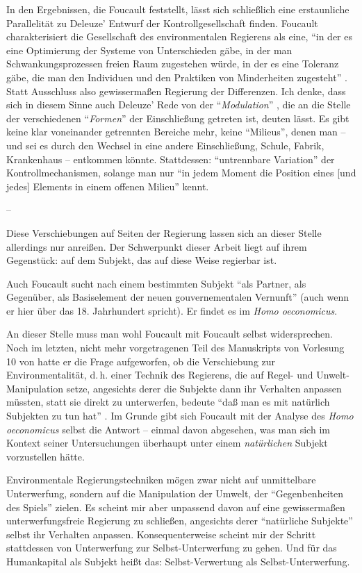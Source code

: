 \documentclass[12pt,
               DIV13,
               paper=a4,
               twoside=false,
               onehalfspacing,
               bibliography=totoc,
               toc=graduated,
               draft,
               ]{scrartcl}
\newcommand{\tit}[1]{\textit{#1}}
\newcommand{\pc}[2]{\parencite[#1]{#2}}
\newcommand{\vgl}[2]{\parencite[vgl.][#1]{#2}}
\newcommand{\worries}[1]{\ifdraft{\textcolor{blue}{\texttt{(#1)}}}{}}
\newcommand{\hoe}{\tit{Homo oeconomicus}\xspace}
\begin{document}
In den Ergebnissen, die Foucault feststellt, lässt sich schließlich
eine erstaunliche Parallelität zu Deleuze' Entwurf der
Kontrollgesellschaft finden. Foucault charakterisiert die Gesellschaft
des environmentalen Regierens als eine, "`in der es eine Optimierung
der Systeme von Unterschieden gäbe, in der man Schwankungsprozessen
freien Raum zugestehen würde, in der es eine Toleranz gäbe, die man
den Individuen und den Praktiken von Minderheiten zugesteht"'
\pc{359}{gbp}. Statt Ausschluss also gewissermaßen Regierung der
Differenzen. Ich denke, dass sich in diesem Sinne auch Deleuze' Rede
von der "`\emph{Modulation}"' \pc{256}{ps}, die an die Stelle der
verschiedenen "`\emph{Formen}"' \pc{256}{ps} der Einschließung
getreten ist, deuten lässt. Es gibt keine klar voneinander getrennten
Bereiche mehr, keine "`Milieus"', denen man -- und sei es durch den
Wechsel in eine andere Einschließung, Schule, Fabrik, Krankenhaus --
entkommen könnte. Stattdessen: "`untrennbare Variation"' \pc{256}{ps}
der Kontrollmechanismen, solange man nur "`in jedem Moment die
Position eines [und jedes] Elements in einem offenen Milieu"'
\pc{261}{ps} kennt.

--

Diese Verschiebungen auf Seiten der Regierung lassen sich an dieser
Stelle allerdings nur anreißen. Der Schwerpunkt dieser Arbeit liegt
auf ihrem Gegenstück: auf dem Subjekt, das auf diese Weise regierbar
ist.

Auch Foucault sucht nach einem bestimmten Subjekt "`als Partner, als
Gegenüber, als Basiselement der neuen gouvernementalen Vernunft"'
\pc{372}{gbp} (auch wenn er hier über das 18. Jahrhundert spricht). Er
findet es im \hoe \vgl{Vorlesung 11, S. 367-398}{gbp}.

An dieser Stelle muss man wohl Foucault mit Foucault selbst
widersprechen. Noch im letzten, nicht mehr vorgetragenen Teil des
Manuskripts von Vorlesung 10 von \cite{gbp} hatte er die Frage
aufgeworfen, ob die Verschiebung zur Environmentalität, d.\,h. einer
Technik des Regierens, die auf Regel- und Unwelt-Manipulation setze,
angesichts derer die Subjekte dann ihr Verhalten anpassen müssten,
statt sie direkt zu unterwerfen, bedeute "`daß man es mit natürlich
Subjekten zu tun hat"' \pc{Fn., S. 361}{gbp}. Im Grunde gibt sich
Foucault mit der Analyse des \hoe selbst die Antwort -- einmal davon
abgesehen, was man sich im Kontext seiner Untersuchungen überhaupt
unter einem \emph{natürlichen} Subjekt vorzustellen hätte.

Environmentale Regierungstechniken mögen zwar nicht auf unmittelbare
Unterwerfung, sondern auf die Manipulation der Umwelt, der
"`Gegenbenheiten des Spiels"' \pc{Fn., S. 360}{gbp} zielen. Es scheint
mir aber unpassend \worries{?} davon auf eine gewissermaßen
unterwerfungsfreie Regierung zu schließen, angesichts derer
"`natürliche Subjekte"' selbst ihr Verhalten anpassen.
Konsequenterweise scheint mir der Schritt stattdessen von Unterwerfung
zur Selbst-Unterwerfung zu gehen. Und für das Humankapital als Subjekt
heißt das: Selbst-Verwertung als Selbst-Unterwerfung.
\end{document}
